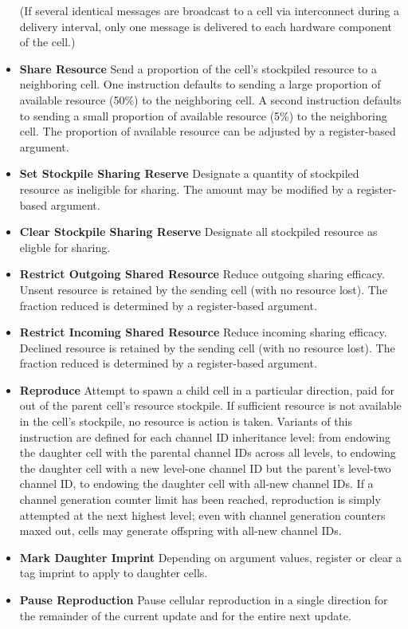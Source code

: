 \begin{itemize}
(If several identical messages are broadcast to a cell via interconnect during a delivery interval, only one message is delivered to each hardware component of the cell.)
\item \textbf{Share Resource}
Send a proportion of the cell's stockpiled resource to a neighboring cell.
One instruction defaults to sending a large proportion of available resource (50\%) to the neighboring cell.
A second instruction defaults to sending a small proportion of available resource (5\%) to the neighboring cell.
The proportion of available resource can be adjusted by a register-based argument.
\item \textbf{Set Stockpile Sharing Reserve}
Designate a quantity of stockpiled resource as ineligible for sharing.
The amount may be modified by a register-based argument.
\item \textbf{Clear Stockpile Sharing Reserve}
Designate all stockpiled resource as eligble for sharing.
\item \textbf{Restrict Outgoing Shared Resource}
Reduce outgoing sharing efficacy.
Unsent resource is retained by the sending cell (with no resource lost).
The fraction reduced is determined by a register-based argument.
\item \textbf{Restrict Incoming Shared Resource}
Reduce incoming sharing efficacy.
Declined resource is retained by the sending cell (with no resource lost).
The fraction reduced is determined by a register-based argument.
\item \textbf{Reproduce}
Attempt to spawn a child cell in a particular direction, paid for out of the parent cell's resource stockpile.
If sufficient resource is not available in the cell's stockpile, no resource is action is taken.
Variants of this instruction are defined for each channel ID inheritance level: from endowing the daughter cell with the parental channel IDs across all levels, to endowing the daughter cell with a new level-one channel ID but the parent's level-two channel ID, to endowing the daughter cell with all-new channel IDs.
If a channel generation counter limit has been reached, reproduction is simply attempted at the next highest level; even with channel generation counters maxed out, cells may generate offspring with all-new channel IDs.
\item \textbf{Mark Daughter Imprint}
Depending on argument values, register or clear a tag imprint to apply to daughter cells.
\item \textbf{Pause Reproduction}
Pause cellular reproduction in a single direction for the remainder of the current update and for the entire next update.

\end{itemize}
